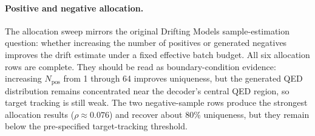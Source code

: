 \documentclass[letterpaper]{article}
\begin{document}
\begin{table}[!h]
\centering
\caption{Strict faithful-Drifting core runs. These rows use the Algorithm-2
drift field without decoder-coupled drift or diversity regularization.}
\label{tab:supp-faithful-core}
\end{table}

\paragraph{Positive and negative allocation.}
The allocation sweep mirrors the original Drifting Models sample-estimation
question: whether increasing the number of positives or generated negatives
improves the drift estimate under a fixed effective batch budget. All six
allocation rows are complete. They should be read as boundary-condition
evidence: increasing $N_{\mathrm{pos}}$ from 1 through 64 improves uniqueness,
but the generated QED distribution remains concentrated near the decoder's
central QED region, so target tracking is still weak. The two negative-sample
rows produce the strongest allocation results ($\rho\approx0.076$) and recover
about 80\% uniqueness, but they remain below the pre-specified target-tracking
threshold.
\end{document}
